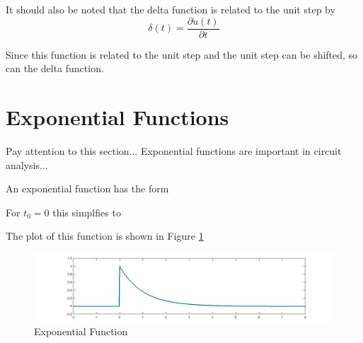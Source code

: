 \documentclass{handout}
\begin{document}

It should also be noted that the delta function is related to the unit step by
\begin{equation}
\delta (t) = \frac{\partial u(t)}{\partial t}
\end{equation}

Since this function is related to the unit step and the unit step can be shifted, so can the delta function.  

\newpage
\clearpage
\pagebreak

\section{Exponential Functions}
Pay attention to this section... Exponential functions are important in circuit analysis...

An exponential function has the form

For $t_0 =0$ this simplfies to

The plot of this function is shown in Figure \ref{fig: Exponential}
\begin{figure} [h!]
\centering
\includegraphics[width=1\textwidth]{Exponential.jpg}
\caption{Exponential Function}
\label{fig: Exponential}
\end{figure}
\end{document}
